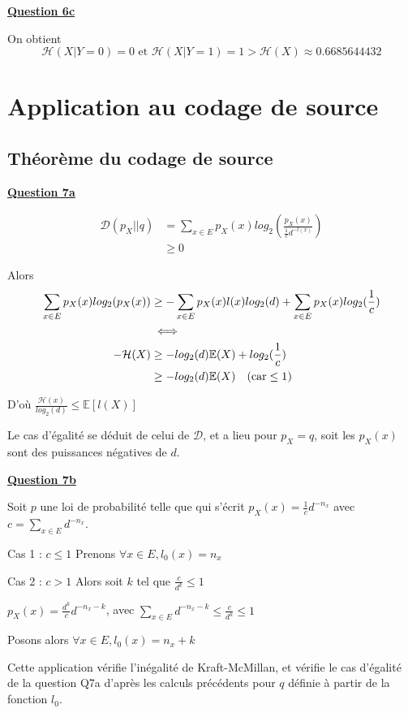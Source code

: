 \documentclass[a4paper,twoside,10pt]{article}
\renewcommand{\H}{\mathcal{H}}
\newcommand{\D}{\mathcal{D}}
\newenvironment{Q}[1]{%
\vspace{1ex}
\underline{\textbf{Question #1\\}}
\newline
}{
\vspace{2ex}
}
\begin{document}
\begin{Q}{6c}
On obtient \[\H(X|Y = 0) = 0 \text{ et } \H(X|Y = 1) = 1 > \H(X) \approx 0.6685644432 \]
\end{Q}

\section{Application au codage de source}
\subsection{Théorème du codage de source}

\begin{Q}{7a}

\begin{align*}
\D(p_X||q) &= \sum_{x \in E}p_X(x)log_2(\frac{p_X(x)}{\frac{1}{c}d^{-l(x)}}) \\
&\geq 0
\end{align*}

Alors
\begin{align*}
\sum_{x \in E}p_X(x)log_2(p_X(x)) &\geq  -\sum_{x \in E}p_X(x)l(x)log_2(d) + \sum_{x \in E}p_X(x)log_2(\frac{1}{c}) \\
 &\iff\\
-\H(X) &\geq -log_2(d) \mathbb{E}(X) + log_2(\frac{1}{c})
\\ &\geq -log_2(d) \mathbb{E}(X) \text{\quad(car} \leq 1 \textsc{)}
\end{align*}

D'où $\frac{\H(x)}{log_2(d)} \leq \mathbb{E}[l(X)]$
 
Le cas d'égalité se déduit de celui de $\D$, et a lieu pour $p_X = q$, soit les $p_X(x)$ sont des puissances négatives de $d$.
\end{Q}

\begin{Q}{7b}
Soit $p$ une loi de probabilité telle que qui s'écrit $p_X(x) = \frac{1}{c}d^{-n_x}$ avec $c = \sum_{x \in E} d^{-n_x}$.

Cas 1 : $c \leq 1$ Prenons $\forall x \in E, l_0(x) = n_x$

Cas 2 : $c > 1$ Alors soit $k$ tel que $\frac{c}{d^k} \leq 1$

$p_X(x) = \frac{d^k}{c}d^{-n_x - k}$, avec $\sum_{x \in E} d^{-n_x - k} \leq \frac{c}{d^k} \leq 1$

Posons alors $\forall x \in E, l_0(x) = n_x + k$

Cette application vérifie l'inégalité de Kraft-McMillan, et vérifie le cas d'égalité de la question Q7a d'après les calculs
précédents pour $q$ définie à partir de la fonction $l_0$.
\end{Q}
\end{document}

